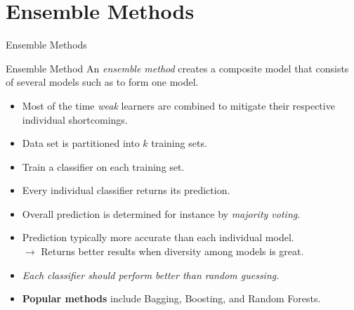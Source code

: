 \section{Ensemble Methods}

\begin{frame}{Ensemble Methods}
	\begin{block}{Ensemble Method}
		An \textit{ensemble method} creates a composite model that consists of several models such as to form one model.
	\end{block}
	\begin{itemize}
		\item Most of the time \textit{weak} learners are combined to mitigate their respective individual shortcomings.
		\item Data set is partitioned into $k$ training sets.
		\item Train a classifier on each training set.
		\item Every individual classifier returns its prediction.
		\item Overall prediction is determined for instance by \textit{majority voting}.
		\item Prediction typically more accurate than each individual model.\\
		      $\rightarrow$ Returns better results when diversity among models is great.
		\item \textit{Each classifier should perform better than random guessing.}
		\item \textbf{Popular methods} include Bagging, Boosting, and Random Forests.
	\end{itemize}
\end{frame}

